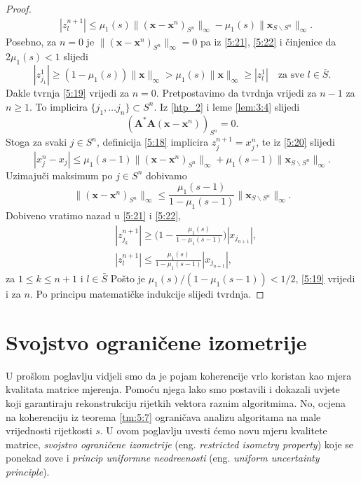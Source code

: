 \documentclass[a4paper,twoside,12pt]{memoir} %
\newcommand{\vect}[1]{\mathbf{#1}}
\renewcommand{\vec}{\vect}
\newcommand{\norm}[1]{\|{#1}\|}
\begin{document}
\begin{proof}
\begin{align}
        &|z_l^{n+1}| \leq \mu_1(s) \norm{(\vec x - \vec x^n)_{S^n}}_{\infty} - \mu_1(s)\norm{\vec x_{S \backslash S^n}}_{\infty}. \label{5:22}
    \end{align}
    Posebno, za $n = 0$ je $\norm{(\vec x - \vec x^n)_{S^n}}_{\infty} = 0$ pa iz \eqref{5:21}, \eqref{5:22} i \v{c}injenice da $2\mu_1(s) < 1$ slijedi
    \begin{equation*}
        |z_{j_1}^1| \geq (1-\mu_1(s))\norm{\vec x}_{\infty} > \mu_1(s) \norm{\vec x}_{\infty} \geq |z_l^1| \quad \text{za sve } l \in \bar S.
    \end{equation*}
    Dakle tvrnja \eqref{5:19} vrijedi za $n = 0$. Pretpostavimo da tvrdnja vrijedi za $n-1$ za $n \geq 1$. To implicira $\{j_1, \dots j_n\} \subset S^n$. Iz \eqref{htp_2} i leme \ref{lem:3:4} slijedi
    \begin{equation*}
        (\vec A^* \vec A (\vec x - \vec x^n))_{S^n} = 0.
    \end{equation*}
    Stoga za svaki $j \in S^n$, definicija \eqref{5:18} implicira $z_j^{n+1} = x_j^n$, te iz \eqref{5:20} slijedi
    \begin{equation*}
        |x_j^n - x_j| \leq \mu_1(s-1) \norm{(\vec x - \vec x^n)_{S^n}}_{\infty} + \mu_1(s-1)\norm{\vec x_{S \backslash S^n}}_{\infty}.
    \end{equation*}
    Uzimaju\v{c}i maksimum po $j \in S^n$ dobivamo
    \begin{equation*}
        \norm{(\vec x - \vec x^n)_{S^n}}_{\infty}  \leq \frac{\mu_1(s-1)}{1 - \mu_1(s-1)} \norm{\vec x_{S \backslash S^n}}_{\infty}.
    \end{equation*}
    Dobiveno vratimo nazad u \eqref{5:21} i \eqref{5:22},
    \begin{align*}
        &|z_{j_k}^{n+1}|  \geq \big( 1 - \frac{\mu_1(s)}{1 - \mu_1(s-1)}\big) |x_{j_{n+1}}|,  \\
        &|z_{l}^{n+1}|  \leq \frac{\mu_1(s)}{1 - \mu_1(s-1)}|x_{j_{n+1}}|,
    \end{align*}
    za $1 \leq k \leq n+1$ i $l \in \bar S$
    Po\v{s}to je $\mu_1(s)/(1-\mu_1(s-1)) < 1/2$, \eqref{5:19} vrijedi i za $n$. Po principu matemati\v{c}ke indukcije slijedi tvrdnja.
\end{proof}

\chapter[Svojstvo ograni\v{c}ene izometrije][Svojstvo ograni\v{c}ene izometrije]{Svojstvo ograni\v{c}ene izometrije}
U pro\v{s}lom poglavlju vidjeli smo da je pojam koherencije vrlo koristan kao mjera kvalitata matrice mjerenja. Pomo\'cu njega lako smo postavili i dokazali uvjete koji garantiraju rekonstrukciju rijetkih vektora raznim algoritmima. No, ocjena na koherenciju iz teorema \eqref{tm:5:7} ograni\v{c}ava analizu algoritama na male vrijednosti rijetkosti $s$. U ovom poglavlju uvesti \'{c}emo novu mjeru kvalitete matrice, \textit{svojstvo ograni\v{c}ene izometrije} (eng. \textit{restricted isometry property}) koje se ponekad zove i \textit{princip uniformne neodre\dj enosti} (eng. \textit{uniform uncertainty principle}).
\end{document}
